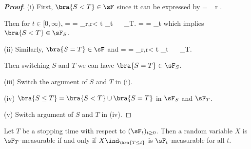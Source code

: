 \begin{proof}[\bf Proof]
\ben
\item [(i)] First, $\bra{S<T}\in \sF$ since it can be expressed by 
\be
{} = \bigcup_{r\in \Q} .
\ee

Then for $t\in [0,\infty)$,
\be
{} \cap {} =  = \bigcup_{r\in \Q,r< t} \cap {} \in \sF_t \ \ra \   \in \sF_T.
\ee
\be
{} \cap {} =   \cup {} =  \cup {} \in \sF_t \nonumber
\ee
which implies $\bra{S<T}  \in \sF_S$.

\item [(ii)] Similarly, $\bra{S=T}\in \sF$ and 
\be
{}\cap {} =  = \bigcup_{r\in \Q,r< t} \cap {} \in \sF_t \ \ra \   \in \sF_T.
\ee

Then switching $S$ and $T$ we can have $\bra{S=T}  \in \sF_S$.

\item [(iii)] Switch the argument of $S$ and $T$ in (i).

\item [(iv)] $\bra{S\leq T} = \bra{S<T}\cup\bra{S=T}$ in $\sF_S$ and $\sF_T$.
\item [(v)] Switch argument of $S$ and $T$ in (iv).
\een
\end{proof}


\begin{proposition}\label{pro:random_variable_stopping_time_measurable}
Let $T$ be a stopping time with respect to $(\sF_t)_{t\geq 0}$. Then a random variable $X$ is $\sF_T$-measurable if and only if $X\ind_{\bra{T \leq t}}$ is $\sF_t$-measurable for all $t$.
\end{proposition}

